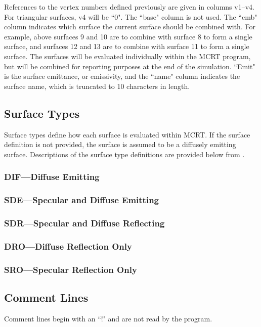 \documentclass{article}
\begin{document}
References to the vertex numbers defined previously are given in columns v1--v4. For triangular surfaces, v4 will be ``0". The ``base" column is not used. The ``cmb" column indicates which surface the current surface should be combined with. For example, above surfaces 9 and 10 are to combine with surface 8 to form a single surface, and surfaces 12 and 13 are to combine with surface 11 to form a single surface. The surfaces will be evaluated individually within the MCRT program, but will be combined for reporting purposes at the end of the simulation. ``Emit" is the surface emittance, or emissivity, and the ``name" column indicates the surface name, which is truncated to 10 characters in length.

\subsection{Surface Types}
\label{subsec:surftypes}
Surface types define how each surface is evaluated within MCRT. If the surface definition is not provided, the surface is assumed to be a diffusely emitting surface. Descriptions of the surface type definitions are provided below from \cite{HolmanSpitlerSikha2012}.

\subsubsection{DIF---Diffuse Emitting}
\label{s-s-sec:dif}

\subsubsection{SDE---Specular and Diffuse Emitting}

\subsubsection{SDR---Specular and Diffuse Reflecting}

\subsubsection{DRO---Diffuse Reflection Only}

\subsubsection{SRO---Specular Reflection Only}

\subsection{Comment Lines}
\label{subsec:comments}
Comment lines begin with an ``!" and are not read by the program.
\end{document}
